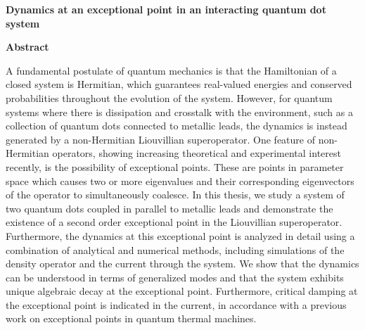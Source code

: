 \documentclass[../main.tex]{subfiles}
\begin{document}
\thispagestyle{plain}
\begin{center}
    \Large
    \textbf{Dynamics at an exceptional point in an interacting quantum dot system}
    
    \vspace{0.4cm}
    
    \vspace{0.4cm}
    
    \vspace{0.9cm}
    \textbf{Abstract}
\end{center}
A fundamental postulate of quantum mechanics is that the Hamiltonian of a closed system is Hermitian, which guarantees real-valued energies and conserved probabilities throughout the evolution of the system. However, for quantum systems where there is dissipation and crosstalk with the environment, such as a collection of quantum dots connected to metallic leads, the dynamics is instead generated by a non-Hermitian Liouvillian superoperator. One feature of non-Hermitian operators, showing increasing theoretical and experimental interest recently, is the possibility of exceptional points. These are points in parameter space which causes two or more eigenvalues and their corresponding eigenvectors of the operator to simultaneously coalesce. In this thesis, we study a system of two quantum dots coupled in parallel to metallic leads and demonstrate the existence of a second order exceptional point in the Liouvillian superoperator. Furthermore, the dynamics at this exceptional point is analyzed in detail using a combination of analytical and numerical methods, including simulations of the density operator and the current through the system. We show that the dynamics can be understood in terms of generalized modes and that the system exhibits unique algebraic decay at the exceptional point. Furthermore, critical damping at the exceptional point is indicated in the current, in accordance with a previous work on exceptional points in quantum thermal machines.
\end{document}
